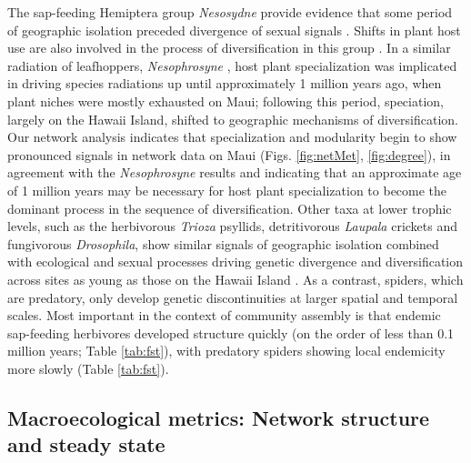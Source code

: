 \documentclass[12pt]{article}
\begin{document}
\begin{linenumbers}
The sap-feeding Hemiptera group {\it Nesosydne} \citep{goodman2012}
provide evidence that some period of geographic isolation preceded
divergence of sexual signals \citep{goodmanInRev}. Shifts in plant
host use are also involved in the process of diversification in this
group \citep{roderick2008}. In a similar radiation of leafhoppers,
{\it Nesophrosyne} \citep{bennett2013}, host plant specialization was
implicated in driving species radiations up until approximately 1
million years ago, when plant niches were mostly exhausted on Maui;
following this period, speciation, largely on the Hawaii Island,
shifted to geographic mechanisms of diversification. Our network
analysis indicates that specialization and modularity begin to show
pronounced signals in network data on Maui (Figs. \ref{fig:netMet},
\ref{fig:degree}), in agreement with the {\it Nesophrosyne} results
and indicating that an approximate age of 1 million years may be
necessary for host plant specialization to become the dominant process
in the sequence of diversification. Other taxa at lower trophic
levels, such as the herbivorous {\it Trioza} psyllids, detritivorous
{\it Laupala} crickets and fungivorous {\it Drosophila}, show similar
signals of geographic isolation combined with ecological and sexual
processes driving genetic divergence and diversification across sites
as young as those on the Hawaii Island \citep{percy2003,percy2006,
  mendelson2005, magnacca2008, ogrady2011}. As a contrast, spiders,
which are predatory, only develop genetic discontinuities at larger
spatial and temporal scales.  Most important in the context of
community assembly is that endemic sap-feeding herbivores developed
structure quickly (on the order of less than 0.1 million years; Table
\ref{tab:fst}), with predatory spiders showing local endemicity more
slowly (Table \ref{tab:fst}).

\subsection*{Macroecological metrics: Network structure and steady
  state}


\end{linenumbers}
\end{document}
